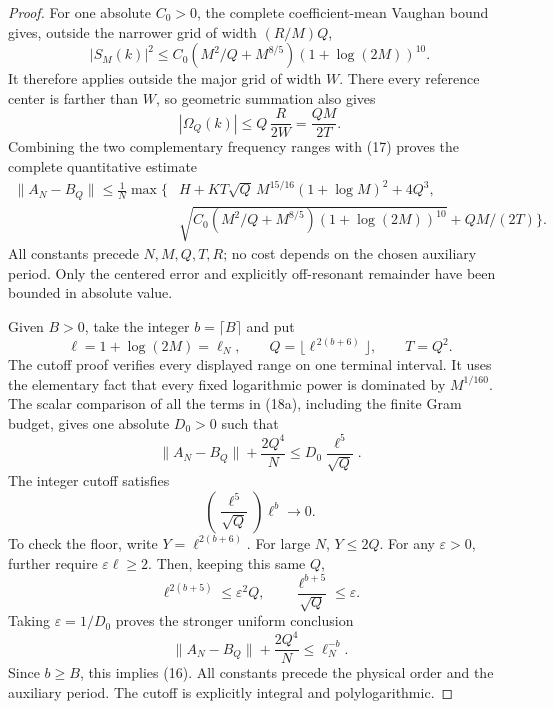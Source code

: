\begin{proof}
For one absolute \(C_0>0\), the complete coefficient-mean Vaughan
bound gives, outside the narrower grid of width \((R/M)Q\),
\[
 |S_M(k)|^2\leq
 C_0\left(M^2/Q+M^{8/5}\right)(1+\log(2M))^{10}.
\]
It therefore applies outside the major grid of width \(W\).
There every reference center is farther than \(W\), so geometric
summation also gives
\[
 |\Omega_Q(k)|\leq Q\,\frac{R}{2W}=\frac{QM}{2T}.
\]
Combining the two complementary frequency ranges with (17)
proves the complete quantitative estimate
\[
\begin{split}
 \|A_N-B_Q\|\leq\frac1N\max\bigl\{
 &H+K T\sqrt Q\,M^{15/16}(1+\log M)^2+4Q^3,\\
 &\sqrt{C_0(M^2/Q+M^{8/5})(1+\log(2M))^{10}}
                         +QM/(2T)\bigr\}.
\end{split}\tag{18a}
\]
All constants precede \(N,M,Q,T,R\); no cost depends on the
chosen auxiliary period. Only the centered error and explicitly
off-resonant remainder have been bounded in absolute value.

Given \(B>0\), take the integer \(b=\lceil B\rceil\) and put
\[
 \ell=1+\log(2M)=\ell_N,\qquad
 Q=\lfloor\ell^{\,2(b+6)}\rfloor,\qquad T=Q^2 .
\]
The cutoff proof verifies every displayed range on one terminal
interval. It uses the elementary fact that every fixed logarithmic
power is dominated by \(M^{1/160}\).
The scalar comparison of all the terms in (18a), including the
finite Gram budget, gives one absolute \(D_0>0\) such that
\[
 \|A_N-B_Q\|+\frac{2Q^4}{N}
 \leq D_0\frac{\ell^5}{\sqrt Q}.
\]
The integer cutoff satisfies
\[
 \left(\frac{\ell^5}{\sqrt Q}\right)\ell^b\longrightarrow0.
\]
To check the floor, write \(Y=\ell^{2(b+6)}\).
For large \(N\), \(Y\leq2Q\).
For any \(\varepsilon>0\), further require
\(\varepsilon\ell\geq2\).
Then, keeping this same \(Q\),
\[
 \ell^{2(b+5)}
 \leq\varepsilon^2Q,\qquad
 \frac{\ell^{b+5}}{\sqrt Q}\leq\varepsilon.
\]
Taking \(\varepsilon=1/D_0\) proves the stronger uniform conclusion
\[
 \boxed{\quad
 \|A_N-B_Q\|+\frac{2Q^4}{N}\leq\ell_N^{-b}.
 \quad}
\]
Since \(b\geq B\), this implies (16).
All constants precede the physical order and the auxiliary period.
The cutoff is explicitly integral and polylogarithmic.
\end{proof}

